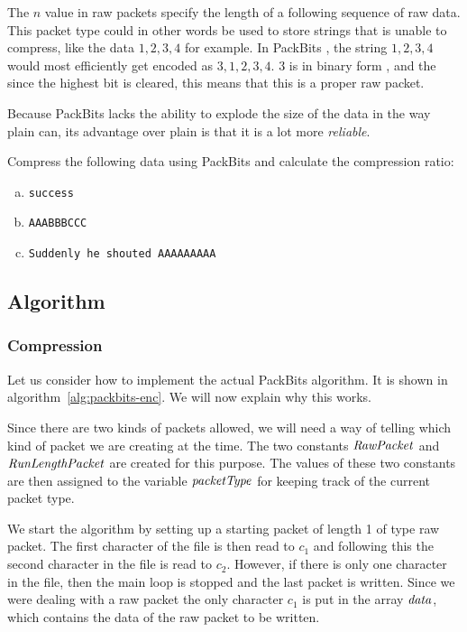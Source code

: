 The $n$ value in raw packets specify the length of a following
sequence of raw data. This packet type could in other words be used to
store strings that \rle is unable to compress, like the data $1,2,3,4$
for example. In PackBits \rle, the string $1,2,3,4$ would most
efficiently get encoded as $3,1,2,3,4$. $3$ is in binary form , and the since the highest bit is cleared, this means that this
is a proper raw packet.

Because PackBits \rle lacks the ability to explode the size of the
data in the way plain \rle can, its advantage over plain \rle is that
it is a lot more \textit{reliable}.

\begin{Exercise}[label={packbits-rle}]

  Compress the following data using PackBits \rle and calculate the
  compression ratio:

  \begin{enumerate}[(a)]
  \item \texttt{success}
  \item \texttt{AAABBBCCC}
  \item \texttt{Suddenly he shouted AAAAAAAAA}
  \end{enumerate}

\end{Exercise}

\subsection{Algorithm}

\subsubsection{Compression}

Let us consider how to implement the actual PackBits \rle
algorithm. It is shown in algorithm~\ref{alg:packbits-enc}. We will
now explain why this works.

Since there are two kinds of packets allowed, we will need a way of
telling which kind of packet we are creating at the time. The two
constants $\mathit{RawPacket}$ and $\mathit{RunLengthPacket}$ are created
for this purpose. The values of these two constants are then assigned
to the variable $\mathit{packetType}$ for keeping track of the current
packet type.

We start the algorithm by setting up a starting packet of length 1 of
type raw packet. The first character of the file is then read to $c_1$
and following this the second character in the file is read to
$c_2$. However, if there is only one character in the file, then the
main loop is stopped and the last packet is written. Since we were
dealing with a raw packet the only character $c_1$ is put in the array
$\mathit{data}$, which contains the data of the raw packet to be written.

